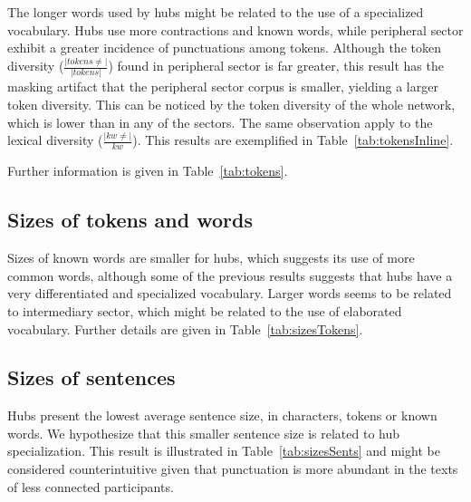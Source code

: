 The longer words used by hubs might be related to the use of a specialized vocabulary.
Hubs use more contractions and known words, while peripheral sector exhibit a greater incidence of punctuations among tokens.
Although the token diversity ($\frac{|tokens \neq|}{|tokens|}$) found in peripheral sector is far greater,
this result has the masking artifact that the peripheral sector corpus is smaller, yielding a larger token diversity.
This can be noticed by the token diversity of the whole network, which is lower than in any of the sectors.
The same observation apply to the lexical diversity ($\frac{|kw\neq|}{kw}$).
This results are exemplified in Table~\ref{tab:tokensInline}.



Further information is given in Table~\ref{tab:tokens}.

\subsection{Sizes of tokens and words}\label{subsec:tw2}
%
Sizes of known words are smaller for hubs, which suggests its use of more common words, although some of the previous results suggests that hubs have a very differentiated and specialized vocabulary. 
Larger words seems to be related to intermediary sector,
which might be related to the use of elaborated vocabulary.
Further details are given in Table~\ref{tab:sizesTokens}.

\subsection{Sizes of sentences}\label{subsec:ss}

Hubs present the lowest average sentence size,
in characters, tokens or known words.
We hypothesize that this smaller sentence size
is related to hub specialization.
This result is illustrated in Table~\ref{tab:sizesSents}
and might be considered counterintuitive given that punctuation
is more abundant in the texts of less connected participants.

